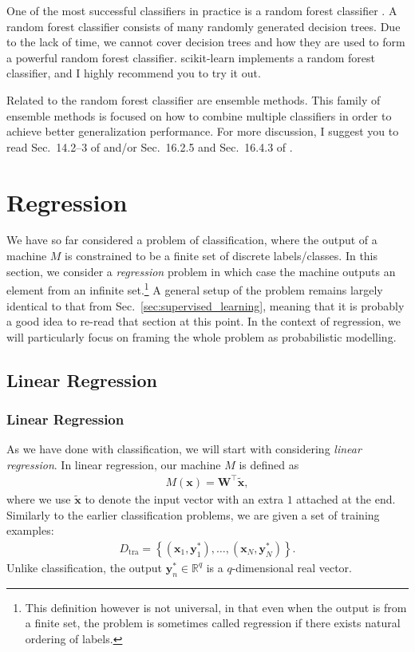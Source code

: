 \documentclass{report}
\newcommand{\vect}[1]{\mathbf{#1}}
\newcommand{\matr}[1]{\mathbf{#1}}
\newcommand{\vx}[0]{\vect{x}}
\newcommand{\vy}[0]{\vect{y}}
\newcommand{\mW}[0]{\matr{W}}
\newcommand{\RR}[0]{\mathbb{R}}
\newcommand{\tra}{\text{tra}}
\begin{document}
One of the most successful classifiers in practice is a random forest
classifier \cite{breiman2001random}. A random forest classifier consists of many randomly generated
decision trees. Due to the lack of time, we cannot cover decision trees and how
they are used to form a powerful random forest classifier. scikit-learn
implements a random forest classifier, and I highly recommend you to try it out.

Related to the random forest classifier are ensemble methods. 
This family of ensemble methods is focused on how to combine multiple
classifiers in order to achieve better generalization performance. For more
discussion, I suggest you to read Sec.~14.2--3 of \cite{bishop2006pattern}
and/or Sec.~16.2.5 and Sec.~16.4.3 of \cite{murphy2012machine}. 



\chapter{Regression}
\label{sec:regression}

We have so far considered a problem of classification, where the output of a
machine $M$ is constrained to be a finite set of discrete labels/classes. In
this section, we consider a {\it regression} problem in which case the machine
outputs an element from an infinite set.\footnote{
    This definition however is not universal, in that even when the output is
    from a finite set, the problem is sometimes called regression if there
    exists natural ordering of labels.
} A general setup of the problem remains largely identical to that from
Sec.~\ref{sec:supervised_learning}, meaning that it is probably a good idea to
re-read that section at this point.  In the context of regression, we will
particularly focus on framing the whole problem as probabilistic modelling. 

\section{Linear Regression}
\label{sec:linear-regression}

\subsection{Linear Regression}

As we have done with classification, we will start with considering {\it linear
regression}. In linear regression, our machine $M$ is defined as 
\begin{align*}
    M(\vx) = \mW^\top \tilde{\vx},
\end{align*}
where we use $\tilde{\vx}$ to denote the input vector with an extra $1$ attached
at the end.  Similarly to the earlier classification problems, we are given a
set of training examples:
\begin{align*}
    D_{\tra} = \left\{ 
        (\vx_1, \vy_1^*), \ldots, (\vx_N, \vy_N^*)
    \right\}.
\end{align*}
Unlike classification, the output $\vy_n^* \in \RR^q$ is a $q$-dimensional real
vector. 
\end{document}
